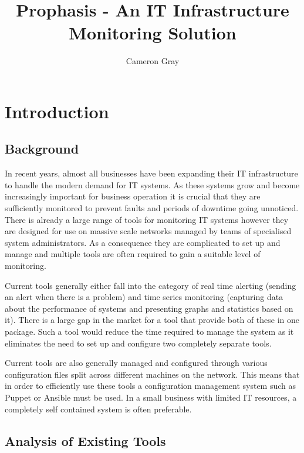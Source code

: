 \documentclass[bsc,deptreport,twoside,parskip,singlespacing,notimes]{infthesis}
\title{Prophasis - An IT Infrastructure Monitoring Solution}
\author{Cameron Gray}
\begin{document}
\maketitle
\tableofcontents


\chapter{Introduction}
\section{Background}

	In recent years, almost all businesses have been expanding their IT
	infrastructure to handle the modern demand for IT systems.  As these systems
	grow and become increasingly important for business operation it is crucial
	that they are sufficiently monitored to prevent faults and periods of downtime
	going unnoticed.  There is already a large range of tools for monitoring IT
	systems however they are  designed for use on massive scale networks managed by
	teams of specialised system administrators.  As a consequence they are
	complicated to set up and manage and multiple tools are often required to gain
	a suitable level of monitoring.


	Current tools generally either fall into the category of real time
	alerting (sending an alert when there is a problem) and time series
	monitoring (capturing data about the performance of systems and presenting
	graphs and statistics based on it). There is a large gap in the market for a
	tool that provide both of these in one package. Such a tool would reduce the
	time required to manage the system as it eliminates the need to set up and
	configure two completely separate tools.


	Current tools are also generally managed and configured through various
	configuration files split across different machines on the network. This means
	that in order to efficiently use these tools a configuration management system
	such as	Puppet or Ansible must be used. In a small business with limited IT
	resources, a completely self contained system is often preferable.

\section{Analysis of Existing Tools}
\label{analysis-of-existing-tools}
\end{document}
